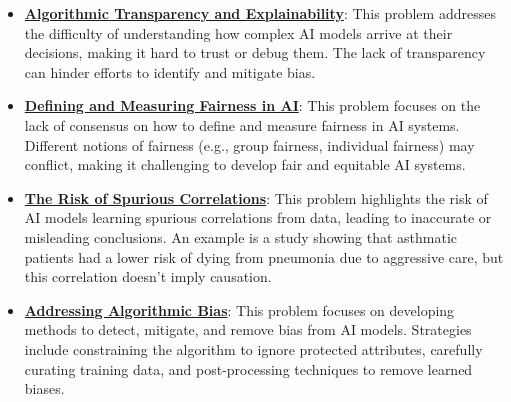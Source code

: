 \documentclass{article}%
\begin{document}
\begin{itemize}[leftmargin=*]
\item \href{https://purdue.brightspace.com/d2l/common/assets/pdfjs-d2l-dist/1.0.14-legacy/web/viewer.html?file=\%2Fcontent\%2Fenforced\%2F1095467-wl.202510.CS.24300.001\%2F16L2-ethics.pdf\%3Fou\%3D1095467\&lang=en-us\&container=d2l-fileviewer-rendered-pdf\&fullscreen=d2l-fileviewer-rendered-pdf-dialog\&height=667#page=28}{\textbf{Algorithmic Transparency and Explainability}}: This problem addresses the difficulty of understanding how complex AI models arrive at their decisions, making it hard to trust or debug them. The lack of transparency can hinder efforts to identify and mitigate bias.%
\item \href{https://purdue.brightspace.com/d2l/common/assets/pdfjs-d2l-dist/1.0.14-legacy/web/viewer.html?file=\%2Fcontent\%2Fenforced\%2F1095467-wl.202510.CS.24300.001\%2F16L2-ethics.pdf\%3Fou\%3D1095467\&lang=en-us\&container=d2l-fileviewer-rendered-pdf\&fullscreen=d2l-fileviewer-rendered-pdf-dialog\&height=667#page=19}{\textbf{Defining and Measuring Fairness in AI}}: This problem focuses on the lack of consensus on how to define and measure fairness in AI systems. Different notions of fairness (e.g., group fairness, individual fairness) may conflict, making it challenging to develop fair and equitable AI systems.%
\item \href{https://purdue.brightspace.com/d2l/common/assets/pdfjs-d2l-dist/1.0.14-legacy/web/viewer.html?file=\%2Fcontent\%2Fenforced\%2F1095467-wl.202510.CS.24300.001\%2F16L2-ethics.pdf\%3Fou\%3D1095467\&lang=en-us\&container=d2l-fileviewer-rendered-pdf\&fullscreen=d2l-fileviewer-rendered-pdf-dialog\&height=667#page=33}{\textbf{The Risk of Spurious Correlations}}: This problem highlights the risk of AI models learning spurious correlations from data, leading to inaccurate or misleading conclusions. An example is a study showing that asthmatic patients had a lower risk of dying from pneumonia due to aggressive care, but this correlation doesn't imply causation.%
\item \href{https://purdue.brightspace.com/d2l/common/assets/pdfjs-d2l-dist/1.0.14-legacy/web/viewer.html?file=\%2Fcontent\%2Fenforced\%2F1095467-wl.202510.CS.24300.001\%2F16L2-ethics.pdf\%3Fou\%3D1095467\&lang=en-us\&container=d2l-fileviewer-rendered-pdf\&fullscreen=d2l-fileviewer-rendered-pdf-dialog\&height=667#page=24}{\textbf{Addressing Algorithmic Bias}}: This problem focuses on developing methods to detect, mitigate, and remove bias from AI models. Strategies include constraining the algorithm to ignore protected attributes, carefully curating training data, and post-processing techniques to remove learned biases.%
\end{itemize}
\end{document}
